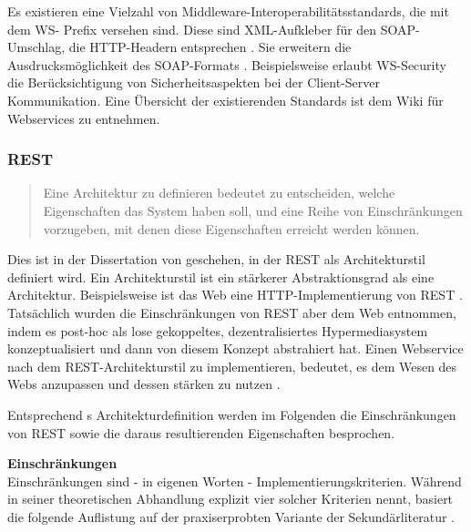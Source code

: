 \documentclass[12pt,a4paper,bibliography=totocnumbered,listof=totoc]{scrartcl}
\begin{document}
Es existieren eine Vielzahl von Middleware-Interoperabilitätsstandards, die mit dem \glqq WS-\grqq{} Prefix versehen sind. Diese sind \glqq XML-Aufkleber\grqq{} für den SOAP-Umschlag, die HTTP-Headern entsprechen \citep{richardson07}. Sie erweitern die Ausdrucksmöglichkeit des SOAP-Formats \citep{wilde11}. Beispielsweise erlaubt WS-Security die Berücksichtigung von Sicherheitsaspekten bei der Client-Server Kommunikation. Eine Übersicht der existierenden Standards ist dem Wiki für Webservices \citet{webServiceWiki09} zu entnehmen.

\subsubsection{REST}
\begin{quote}
\glqq Eine Architektur zu definieren bedeutet zu entscheiden, welche Eigenschaften das System haben soll, und eine Reihe von Einschränkungen vorzugeben, mit denen diese Eigenschaften erreicht werden können.\grqq{} \citep{tilkov11}
\end{quote}

Dies ist in der Dissertation von \citeauthor{fielding00} geschehen, in der REST als Architekturstil definiert wird. Ein Architekturstil ist ein stärkerer Abstraktionsgrad als eine Architektur. Beispielsweise ist das Web eine HTTP-Implementierung von REST \citep{tilkov11}. Tatsächlich wurden die Einschränkungen von REST aber dem Web entnommen, indem \citeauthor{fielding00} es post-hoc als lose gekoppeltes, dezentralisiertes Hypermediasystem konzeptualisiert \citep{wilde11} und dann von diesem Konzept abstrahiert hat. Einen Webservice nach dem REST-Architekturstil zu implementieren, bedeutet, es dem Wesen des Webs anzupassen und dessen stärken zu nutzen \citep{tilkov11}.

Entsprechend \citeauthor{tilkov11}s Architekturdefinition werden im Folgenden die Einschränkungen von REST sowie die daraus resultierenden Eigenschaften besprochen.

\textbf{Einschränkungen}\\
Einschränkungen sind - in eigenen Worten - Implementierungskriterien. Während \citeauthor{fielding00} in seiner theoretischen Abhandlung explizit vier solcher Kriterien nennt, basiert die folgende Auflistung auf der praxiserprobten Variante der Sekundärliteratur \citep{wilde11, tilkov11}.
\end{document}
